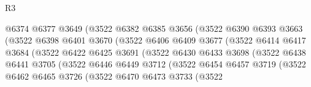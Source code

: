 \begin{lexlean}{R3}
\begin{coremodule}
                                @6374
                                @6377
                                @3649
                                (@3522
                                  @6382
                                  @6385
                                  @3656
                                  (@3522
                                    @6390
                                    @6393
                                    @3663
                                    (@3522
                                      @6398
                                      @6401
                                      @3670
                                      (@3522
                                        @6406
                                        @6409
                                        @3677
                                        (@3522
                                          @6414
                                          @6417
                                          @3684
                                          (@3522
                                            @6422
                                            @6425
                                            @3691
                                            (@3522
                                              @6430
                                              @6433
                                              @3698
                                              (@3522
                                                @6438
                                                @6441
                                                @3705
                                                (@3522
                                                  @6446
                                                  @6449
                                                  @3712
                                                  (@3522
                                                    @6454
                                                    @6457
                                                    @3719
                                                    (@3522
                                                      @6462
                                                      @6465
                                                      @3726
                                                      (@3522
                                                        @6470
                                                        @6473
                                                        @3733
                                                        (@3522

\end{coremodule}
\end{lexlean}
